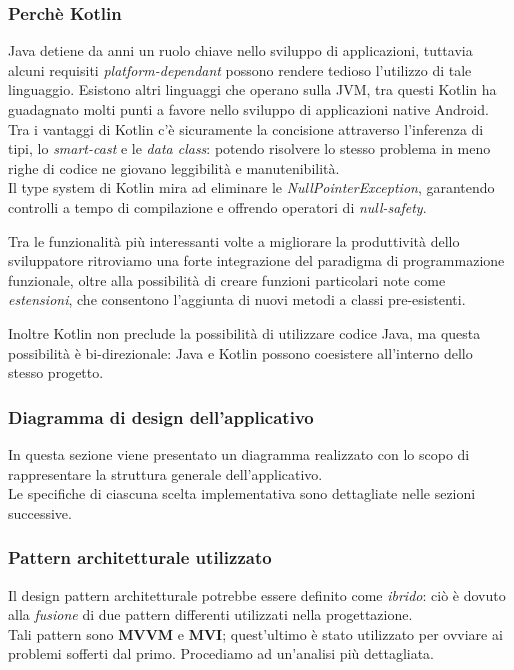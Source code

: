 \documentclass{natourDoc}
\begin{document}
\subsubsection{Perchè Kotlin}
Java detiene da anni un ruolo chiave nello sviluppo di applicazioni, tuttavia alcuni requisiti \textit{platform-dependant} 
possono rendere tedioso l'utilizzo di tale linguaggio. Esistono altri linguaggi che operano sulla JVM, tra questi Kotlin ha guadagnato
molti punti a favore nello sviluppo di applicazioni native Android. \\

Tra i vantaggi di Kotlin c'è sicuramente la concisione attraverso l'inferenza di tipi, lo \textit{smart-cast} e le \textit{data class}: 
potendo risolvere lo stesso problema in meno righe di codice ne giovano leggibilità e manutenibilità. \\
Il type system di Kotlin mira ad eliminare le \textit{NullPointerException}, garantendo controlli a tempo di compilazione e offrendo
operatori di \textit{null-safety}.

Tra le funzionalità più interessanti volte a migliorare la produttività dello sviluppatore ritroviamo una forte integrazione del paradigma di
programmazione funzionale, oltre alla possibilità di creare funzioni particolari note come \textit{estensioni}, che consentono l'aggiunta
di nuovi metodi a classi pre-esistenti. 

Inoltre Kotlin non preclude la possibilità di utilizzare codice Java, ma questa possibilità è bi-direzionale: Java e Kotlin possono coesistere
all'interno dello stesso progetto.

\newpage

\subsubsection{Diagramma di design dell'applicativo}
In questa sezione viene presentato un diagramma realizzato con lo scopo di rappresentare la struttura generale dell'applicativo. \\
Le specifiche di ciascuna scelta implementativa sono dettagliate nelle sezioni successive.
\begin{figure}[!htbp]
	\centering
	
\end{figure}

\newpage
\subsubsection{Pattern architetturale utilizzato}
Il design pattern architetturale potrebbe essere definito come \textit{ibrido}: ciò è dovuto alla
\textit{fusione} di due pattern differenti utilizzati nella progettazione. \\
Tali pattern sono \textbf{MVVM} e \textbf{MVI}; quest'ultimo è stato utilizzato per ovviare ai problemi
sofferti dal primo. Procediamo ad un'analisi più dettagliata. \\
\end{document}
